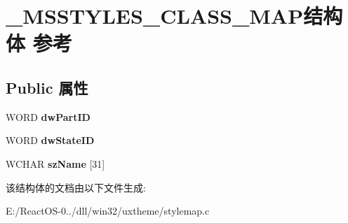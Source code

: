 \hypertarget{struct___m_s_s_t_y_l_e_s___c_l_a_s_s___m_a_p}{}\section{\+\_\+\+M\+S\+S\+T\+Y\+L\+E\+S\+\_\+\+C\+L\+A\+S\+S\+\_\+\+M\+A\+P结构体 参考}
\label{struct___m_s_s_t_y_l_e_s___c_l_a_s_s___m_a_p}
\subsection*{Public 属性}
\begin{DoxyCompactItemize}
\item 
\mbox{\label{struct___m_s_s_t_y_l_e_s___c_l_a_s_s___m_a_p_a4a15331ec3f487a26667c1d550450c72}} 
W\+O\+RD {\bfseries dw\+Part\+ID}
\item 
\mbox{\label{struct___m_s_s_t_y_l_e_s___c_l_a_s_s___m_a_p_ae44e2a4f6ef0ec8ab2799374cd43325d}} 
W\+O\+RD {\bfseries dw\+State\+ID}
\item 
\mbox{\label{struct___m_s_s_t_y_l_e_s___c_l_a_s_s___m_a_p_a26a1430a04eb6501577feecc5fe4f90c}} 
W\+C\+H\+AR {\bfseries sz\+Name} \mbox{[}31\mbox{]}
\end{DoxyCompactItemize}


该结构体的文档由以下文件生成\+:\begin{DoxyCompactItemize}
\item 
E\+:/\+React\+O\+S-\/0../dll/win32/uxtheme/stylemap.\+c\end{DoxyCompactItemize}
